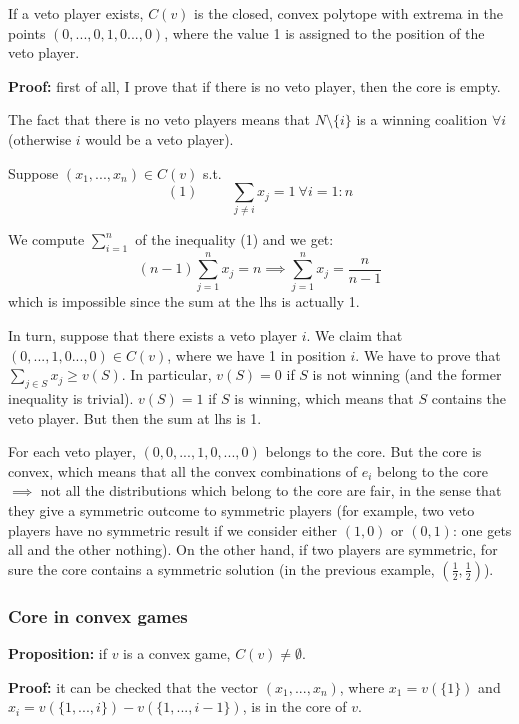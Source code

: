 \noindent If a veto player exists, $C(v)$ is the closed, convex polytope with extrema in the points $(0,...,0,1,0...,0)$, where the value 1 is assigned to the position of the veto player.

\bigskip
\noindent \textbf{Proof:} first of all, I prove that if there is 
no veto player, then the core is empty.

\noindent The fact that there is no veto players means that $N\setminus\{i\}$ is a winning coalition 
$\forall i$ (otherwise $i$ would be a veto player).

\noindent Suppose $(x_1,...,x_n) \in C(v)$ s.t. 
\[(1) \hspace{1cm} \sum_{j \neq i}{x_j} = 1 ~\forall i=1:n\]

\noindent We compute $\sum_{i=1}^n$ of the inequality (1) and we get:
\[
	(n-1) \sum_{j=1}^n{x_j} = n \implies \sum_{j=1}^n{x_j} = \frac{n}{n-1}
\]
which is impossible since the sum at the lhs is actually 1.

\noindent In turn, suppose that there exists a veto player $i$. We claim that 
$(0,...,1,0...,0) \in C(v)$, where we have 1 in position $i$. We have to prove 
that $\sum_{j \in S}{x_j} \geq v(S)$. In particular, $v(S)=0$ if $S$ is not 
winning (and the former inequality is trivial). $v(S)=1$ if $S$ is winning, 
which means that $S$ contains the veto player. But then the sum at lhs is 1.

\noindent For each veto player, $(0,0,...,1,0,...,0)$ belongs to the core. But 
the core is convex, which means that all the convex combinations of $e_i$ 
belong to the core $\implies$ not all the distributions which belong to the 
core are fair, in the sense that they give a symmetric outcome to symmetric 
players (for example, two veto players have no symmetric result if we consider 
either $(1,0)$ or $(0,1)$: one gets all and the other nothing). On the other 
hand, if two players are symmetric, for sure the core contains a symmetric 
solution (in the previous example, $(\frac{1}{2},\frac{1}{2})$). 

\subsubsection{Core in convex games}

\noindent \textbf{Proposition:} if $v$ is a convex game, $C(v) \neq \emptyset$.

\bigskip
\noindent \textbf{Proof:} it can be checked that the vector $(x_1,...,x_n)$, where $x_1 = v(\{1\})$ and $x_i = v(\{1,...,i\}) - v(\{1,...,i-1\})$, is in the core of $v$.

